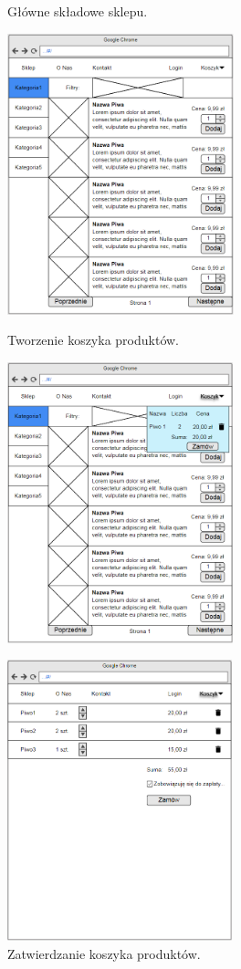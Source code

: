 \documentclass[11pt,a4paper,twoside]{article}
\begin{document}
\begin{figure}[] 
  \begin{minipage}[b]{0.5\linewidth}
  	\caption{Główne składowe sklepu.}
  	\label{mainpage}
    \centering
    \includegraphics[height=8.15cm, width=.75\linewidth]{mainpage} 
    \vspace{4ex}
  \end{minipage}%
  \begin{minipage}[b]{0.5\linewidth}
  	\caption{Tworzenie koszyka produktów.} 
  	\label{opencart}
    \centering
    \includegraphics[height=8.15cm, width=.75\linewidth]{opencart} 
    \vspace{4ex}
  \end{minipage} 
  \begin{minipage}[b]{0.5\linewidth}
  	\caption{Zatwierdzanie koszyka produktów.} 
  	\label{finalizingcart}
    \centering
    \includegraphics[height=8.15cm, width=.75\linewidth]{finalizingcart} 

\end{minipage}
\end{figure}
\end{document}

